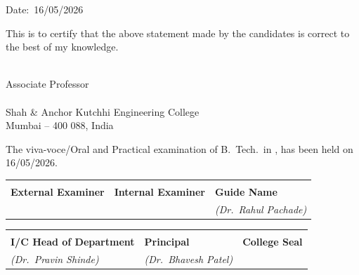 \begin{minipage}[t]{\textwidth}
\vspace{0.5\baselineskip}
\noindent Date:~16/05/2026

\vspace{0.3\baselineskip}
\noindent
This is to certify that the above statement made by the candidates is correct to the
best of my knowledge.

\vspace{0.4\baselineskip}
\noindent
{\mysupervisor}\\
Associate Professor\\
{\mydep}\\
Shah \& Anchor Kutchhi Engineering College\\
Mumbai -- 400 088, India

\vspace{0.5\baselineskip}
\noindent
The viva-voce/Oral and Practical examination of B.~Tech.\ in \branch,
has been held on 16/05/2026.

\vspace{0.7\baselineskip}
\noindent
\begin{tabular}{p{}p{}p{}}
 & & \\[1.0cm]
\textbf{External Examiner} & \textbf{Internal Examiner} & \textbf{Guide Name}\\[3pt]
                           &                            & \textit{(Dr.\ Rahul Pachade)}
\end{tabular}

\vspace{1.0\baselineskip}
\noindent
\begin{tabular}{p{}p{}p{}}
 & & \\[1.0cm]
\textbf{I/C Head of Department} & \textbf{Principal}        & \textbf{College Seal}\\[3pt]
\textit{(Dr.\ Pravin Shinde)}   & \textit{(Dr.\ Bhavesh Patel)} &
\end{tabular}

\end{minipage}